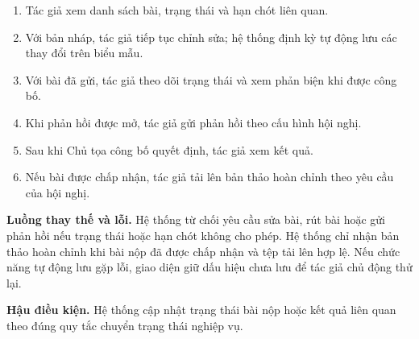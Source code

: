 \begin{enumerate}
  \item Tác giả xem danh sách bài, trạng thái và hạn chót liên quan.
  \item Với bản nháp, tác giả tiếp tục chỉnh sửa; hệ thống định kỳ tự động lưu các thay đổi trên biểu mẫu.
  \item Với bài đã gửi, tác giả theo dõi trạng thái và xem phản biện khi được công bố.
  \item Khi phản hồi được mở, tác giả gửi phản hồi theo cấu hình hội nghị.
  \item Sau khi Chủ tọa công bố quyết định, tác giả xem kết quả.
  \item Nếu bài được chấp nhận, tác giả tải lên bản thảo hoàn chỉnh theo yêu cầu của hội nghị.
\end{enumerate}

\textbf{Luồng thay thế và lỗi.} Hệ thống từ chối yêu cầu sửa bài, rút bài hoặc gửi phản hồi nếu trạng thái hoặc hạn chót không cho phép. Hệ thống chỉ nhận bản thảo hoàn chỉnh khi bài nộp đã được chấp nhận và tệp tải lên hợp lệ. Nếu chức năng tự động lưu gặp lỗi, giao diện giữ dấu hiệu chưa lưu để tác giả chủ động thử lại.

\textbf{Hậu điều kiện.} Hệ thống cập nhật trạng thái bài nộp hoặc kết quả liên quan theo đúng quy tắc chuyển trạng thái nghiệp vụ.

